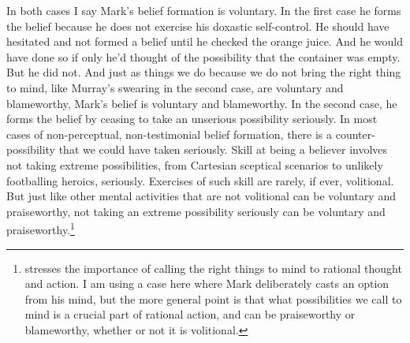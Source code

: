 In both cases I say Mark's belief formation is voluntary. In the first case he forms the belief because he does not exercise his doxastic self-control. He should have hesitated and not formed a belief until he checked the orange juice. And he would have done so if only he'd thought of the possibility that the container was empty. But he did not. And just as things we do because we do not bring the right thing to mind, like Murray's swearing in the second case, are voluntary and blameworthy, Mark's belief is voluntary and blameworthy. In the second case, he forms the belief by ceasing to take an unserious possibility seriously. In most cases of non-perceptual, non-testimonial belief formation, there is a counter-possibility that we could have taken seriously. Skill at being a believer involves not taking extreme possibilities, from Cartesian sceptical scenarios to unlikely footballing heroics, seriously. Exercises of such skill are rarely, if ever, volitional. But just like other mental activities that are not volitional can be voluntary and praiseworthy, not taking an extreme possibility seriously can be voluntary and praiseworthy.\footnote{\cite[29ff]{Ryle1949} stresses the importance of calling the right things to mind to rational thought and action. I am using a case here where Mark deliberately casts an option from his mind, but the more general point is that what possibilities we call to mind is a crucial part of rational action, and can be praiseworthy or blameworthy, whether or not it is volitional.}

